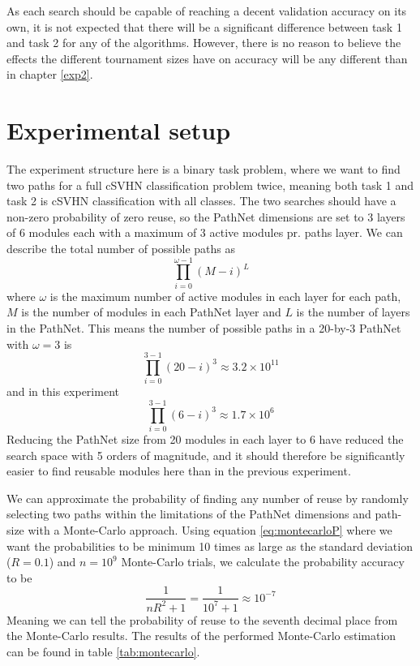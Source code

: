 As each search should be capable of reaching a decent validation accuracy on its own, it is not expected that there will be a significant difference between task 1 and task 2 for any of the algorithms. However, there is no reason to believe the effects the different tournament sizes have on accuracy will be any different than in chapter \ref{exp2}. 

\section{Experimental setup}
The experiment structure here is a binary task problem, where we want to find two paths for a full cSVHN classification problem twice, meaning both task 1 and task 2 is cSVHN classification with all classes. The two searches should have a non-zero probability of zero reuse, so the PathNet dimensions are set to 3 layers of 6 modules each with a maximum of 3 active modules pr. paths layer. We can describe the total number of possible paths as 
\begin{equation*}
    \prod_{i=0}^{\omega-1}(M-i)^{L}
\end{equation*}
where \(\omega\) is the maximum number of active modules in each layer for each path, \(M\) is the number of modules in each PathNet layer and  \(L\) is the number of layers in the PathNet. This means the number of possible paths in a 20-by-3 PathNet with \(\omega=3\) is  
\begin{equation*}
    \prod_{i=0}^{3-1}(20-i)^{3}\approx 3.2\times10^{11}
\end{equation*}
and in this experiment
\begin{equation*}
    \prod_{i=0}^{3-1}(6-i)^{3}\approx 1.7\times10^{6}
\end{equation*}
Reducing the PathNet size from 20 modules in each layer to 6 have reduced the search space with 5 orders of magnitude, and it should therefore be significantly easier to find reusable modules here than in the previous experiment.



We can approximate the probability of finding any number of reuse by randomly selecting two paths within the limitations of the PathNet dimensions and path-size with a Monte-Carlo approach. Using equation \ref{eq:montecarloP} where we want the probabilities to be minimum 10 times as large as the standard deviation (\(R=0.1\)) and \(n=10^{9}\) Monte-Carlo trials, we calculate the probability accuracy to be 
\begin{equation*}
    \frac{1}{nR^{2}+1}=\frac{1}{10^{7}+1}\approx10^{-7}
\end{equation*}
Meaning we can tell the probability of reuse to the seventh decimal place from the Monte-Carlo results. The results of the performed Monte-Carlo estimation can be found in table \ref{tab:montecarlo}.

